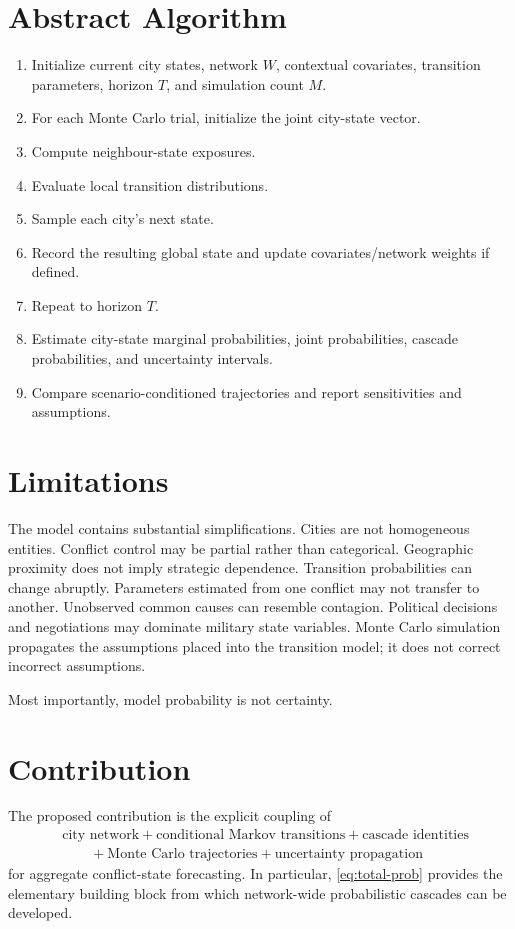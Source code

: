 \documentclass[11pt,letterpaper]{article}
\begin{document}
\section{Abstract Algorithm}
\begin{enumerate}[leftmargin=2em]
\item Initialize current city states, network $W$, contextual covariates, transition parameters, horizon $T$, and simulation count $M$.
\item For each Monte Carlo trial, initialize the joint city-state vector.
\item Compute neighbour-state exposures.
\item Evaluate local transition distributions.
\item Sample each city's next state.
\item Record the resulting global state and update covariates/network weights if defined.
\item Repeat to horizon $T$.
\item Estimate city-state marginal probabilities, joint probabilities, cascade probabilities, and uncertainty intervals.
\item Compare scenario-conditioned trajectories and report sensitivities and assumptions.
\end{enumerate}

\section{Limitations}
The model contains substantial simplifications. Cities are not homogeneous entities. Conflict control may be partial rather than categorical. Geographic proximity does not imply strategic dependence. Transition probabilities can change abruptly. Parameters estimated from one conflict may not transfer to another. Unobserved common causes can resemble contagion. Political decisions and negotiations may dominate military state variables. Monte Carlo simulation propagates the assumptions placed into the transition model; it does not correct incorrect assumptions.

Most importantly, model probability is not certainty.

\section{Contribution}
The proposed contribution is the explicit coupling of
\begin{equation}
\begin{aligned}
&\text{city network}+\text{conditional Markov transitions}+\text{cascade identities}\\
&\qquad+\text{Monte Carlo trajectories}+\text{uncertainty propagation}
\end{aligned}
\end{equation}
for aggregate conflict-state forecasting. In particular, \cref{eq:total-prob} provides the elementary building block from which network-wide probabilistic cascades can be developed.
\end{document}
